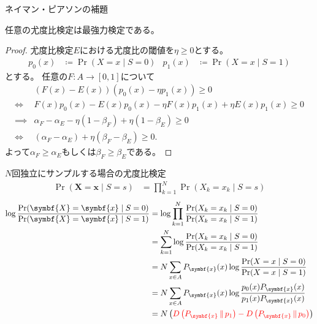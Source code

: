 \documentclass[lualatex,handout]{beamer}
\newcommand{\mycolor}[2]{%
  \begingroup
  \colorlet{currentcolor}{.}%
  \color{#1}#2%
  \color{currentcolor}%
  \endgroup
}
\newcommand{\emm}[1]{\mycolor{red}{#1}}
\newcommand\KL[2]{D\left(#1\,\|\,#2\right)}
\theoremstyle{definition}
\begin{document}
\begin{frame}{ネイマン・ピアソンの補題}
\small
\begin{lemma}[ネイマン・ピアソンの補題]
任意の尤度比検定は最強力検定である。
\end{lemma}
\begin{proof}
尤度比検定$E$における尤度比の閾値を$\eta\ge 0$とする。
\begin{align*}
p_0(x) &\coloneq \Pr(X = x\mid S = 0)&
p_1(x) &\coloneq \Pr(X = x\mid S = 1)
\end{align*}
とする。
任意の$F\colon A\to[0,1]$について
\begin{align*}
&(F(x) - E(x)) (p_0(x) - \eta p_1(x))\ge 0\\
\iff&F(x)p_0(x) - E(x)p_0(x) - \eta F(x) p_1(x) + \eta E(x) p_1(x)\ge 0\\
\implies&\alpha_F - \alpha_E - \eta (1-\beta_F)  + \eta (1-\beta_E)\ge 0\\
\iff&(\alpha_F - \alpha_E) + \eta(\beta_F-\beta_E)\ge 0.
\end{align*}
よって$\alpha_F\ge\alpha_E$もしくは$\beta_F\ge\beta_E$である。
\end{proof}
\end{frame}

\begin{frame}{$N$回独立にサンプルする場合の尤度比検定}
\begin{align*}
\Pr(\symbf{X}=\symbf{x}\mid S = s) &= \prod_{k=1}^N \Pr(X_k=x_k\mid S = s)
\end{align*}
\begin{align*}
\log \frac{\Pr(\symbf{X}=\symbf{x}\mid S = 0)}{\Pr(\symbf{X}=\symbf{x}\mid S = 1)}
&=
\log \prod_{k=1}^N \frac{\Pr(X_k=x_k\mid S = 0)}{\Pr(X_k=x_k\mid S = 1)}\\
&=
\sum_{k=1}^N \log \frac{\Pr(X_k=x_k\mid S = 0)}{\Pr(X_k=x_k\mid S = 1)}\\
&=
N\sum_{x\in A} P_{\symbf{x}}(x) \log \frac{\Pr(X=x\mid S = 0)}{\Pr(X=x\mid S = 1)}\\
&=
N\sum_{x\in A} P_{\symbf{x}}(x) \log \frac{p_0(x)P_{\symbf{x}}(x)}{p_1(x)P_{\symbf{x}}(x)}\\
&=
N\left(\emm{\KL{P_{\symbf{x}}}{p_1} - \KL{P_{\symbf{x}}}{p_0}}\right)
\end{align*}
\end{frame}
\end{document}
